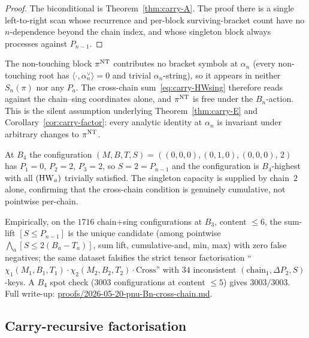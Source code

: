 \begin{proof}
The biconditional is Theorem~\ref{thm:carry-A}. The proof there is a single
left-to-right scan whose recurrence and per-block surviving-bracket count have
no $n$-dependence beyond the chain index, and whose singleton block always
processes against $P_{n-1}$.
\end{proof}

\begin{remark}\label{rmk:NT-drop}
The non-touching block $\pi^{\mathrm{NT}}$ contributes no bracket symbols at $\alpha_n$
(every non-touching root has $\langle \cdot, \alpha_n^\vee\rangle = 0$ and trivial
$\alpha_n$-string), so it appears in neither $S_n(\pi)$ nor any $P_a$. The cross-chain
sum~\eqref{eq:carry-HWsing} therefore reads against the chain--sing coordinates
alone, and $\pi^{\mathrm{NT}}$ is free under the $B_n$-action. This is the silent assumption
underlying Theorem~\ref{thm:carry-E} and Corollary~\ref{cor:carry-factor}: every analytic
identity at $\alpha_n$ is invariant under arbitrary changes to $\pi^{\mathrm{NT}}$.
\end{remark}

\begin{example}\label{ex:carry-cross-B4}
At $B_4$ the configuration $(M, B, T, S) = ((0,0,0), (0,1,0), (0,0,0),\, 2)$ has
$P_1 = 0$, $P_2 = 2$, $P_3 = 2$, so $S = 2 = P_{n-1}$ and the configuration is
$B_4$-highest with all $(\mathrm{HW}_a)$ trivially satisfied. The singleton capacity
is supplied by chain~$2$ alone, confirming that the cross-chain condition is
genuinely cumulative, not pointwise per-chain.
\end{example}

Empirically, on the $1716$ chain+sing configurations at $B_3$, content $\le 6$,
the sum-lift $[S \le P_{n-1}]$ is the unique candidate (among pointwise
$\bigwedge_a [S \le 2(B_a - T_a)]$, sum lift, cumulative-and, min, max) with zero
false negatives; the same dataset falsifies the strict tensor factorisation
``$\chi_1(M_1, B_1, T_1) \cdot \chi_2(M_2, B_2, T_2) \cdot \mathrm{Cross}$'' with
$34$ inconsistent $(\mathrm{chain}_1, \Delta P_2, S)$-keys. A $B_4$ spot check
($3003$ configurations at content $\le 5$) gives $3003/3003$. Full write-up:
\url{proofs/2026-05-20-pnu-Bn-cross-chain.md}.

\subsection{Carry-recursive factorisation}\label{ssec:carry-factor}

